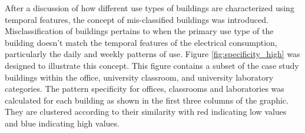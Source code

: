After a discussion of how different use types of buildings are characterized using temporal features, the concept of mis-classified buildings was introduced. Misclassification of buildings pertains to when the primary use type of the building doesn't match the temporal features of the electrical consumption, particularly the daily and weekly patterns of use. Figure \ref{fig:specificity_high} was designed to illustrate this concept. This figure contains a subset of the case study buildings within the office, university classroom, and university laboratory categories. The pattern specificity for offices, classrooms and laboratories was calculated for each building as shown in the first three columns of the graphic. They are clustered according to their similarity with red indicating low values and blue indicating high values.